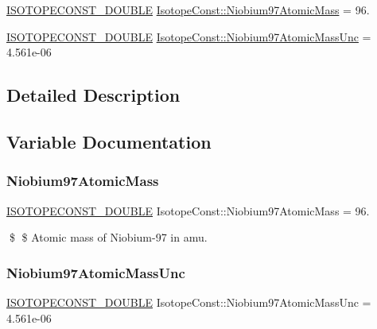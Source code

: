 \begin{DoxyCompactItemize}
\item 
\mbox{\hyperlink{group___isotope_const-_macros_ga8f45a7272ce02c0b4c65c44636ed719a}{I\+S\+O\+T\+O\+P\+E\+C\+O\+N\+S\+T\+\_\+\+D\+O\+U\+B\+LE}} \mbox{\hyperlink{group___isotope_const-_niobium-_nb97_gae6fa1d7108b188eafab0ccae51a3aaa1}{Isotope\+Const\+::\+Niobium97\+Atomic\+Mass}} = 96.
\item 
\mbox{\hyperlink{group___isotope_const-_macros_ga8f45a7272ce02c0b4c65c44636ed719a}{I\+S\+O\+T\+O\+P\+E\+C\+O\+N\+S\+T\+\_\+\+D\+O\+U\+B\+LE}} \mbox{\hyperlink{group___isotope_const-_niobium-_nb97_ga6802237542ec1d4ef9728a447b63e562}{Isotope\+Const\+::\+Niobium97\+Atomic\+Mass\+Unc}} = 4.\+561e-\/06
\end{DoxyCompactItemize}


\subsection{Detailed Description}


\subsection{Variable Documentation}
\mbox{\label{group___isotope_const-_niobium-_nb97_gae6fa1d7108b188eafab0ccae51a3aaa1}} 
\subsubsection{\texorpdfstring{Niobium97\+Atomic\+Mass}{Niobium97AtomicMass}}
{\footnotesize\ttfamily \mbox{\hyperlink{group___isotope_const-_macros_ga8f45a7272ce02c0b4c65c44636ed719a}{I\+S\+O\+T\+O\+P\+E\+C\+O\+N\+S\+T\+\_\+\+D\+O\+U\+B\+LE}} Isotope\+Const\+::\+Niobium97\+Atomic\+Mass = 96.}

\$ \$ Atomic mass of Niobium-\/97 in amu. \mbox{\label{group___isotope_const-_niobium-_nb97_ga6802237542ec1d4ef9728a447b63e562}} 
\subsubsection{\texorpdfstring{Niobium97\+Atomic\+Mass\+Unc}{Niobium97AtomicMassUnc}}
{\footnotesize\ttfamily \mbox{\hyperlink{group___isotope_const-_macros_ga8f45a7272ce02c0b4c65c44636ed719a}{I\+S\+O\+T\+O\+P\+E\+C\+O\+N\+S\+T\+\_\+\+D\+O\+U\+B\+LE}} Isotope\+Const\+::\+Niobium97\+Atomic\+Mass\+Unc = 4.\+561e-\/06}

